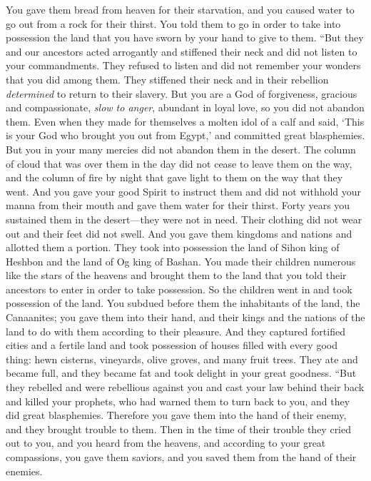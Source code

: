 \begin{biblechapter}
\verse You gave them bread from heaven for their starvation, and you caused water to go out from a rock for their thirst. You told them to go in order to take into possession the land that you have sworn by your hand to give to them.
\verse “But they and our ancestors acted arrogantly and stiffened their neck and did not listen to your commandments.
\verse They refused to listen and did not remember your wonders that you did among them. They stiffened their neck and in their rebellion \textit{determined} to return to their slavery. But you are a God of forgiveness, gracious and compassionate, \textit{slow to anger}, abundant in loyal love, so you did not abandon them.
\verse Even when they made for themselves a molten idol of a calf and said, ‘This is your God who brought you out from Egypt,’ and committed great blasphemies.
\verse But you in your many mercies did not abandon them in the desert. The column of cloud that was over them in the day did not cease to leave them on the way, and the column of fire by night that gave light to them on the way that they went.
\verse And you gave your good Spirit to instruct them and did not withhold your manna from their mouth and gave them water for their thirst.
\verse Forty years you sustained them in the desert—they were not in need. Their clothing did not wear out and their feet did not swell.
\verse And you gave them kingdoms and nations and allotted them a portion. They took into possession the land of Sihon king of Heshbon and the land of Og king of Bashan.
\verse You made their children numerous like the stars of the heavens and brought them to the land that you told their ancestors to enter in order to take possession.
\verse So the children went in and took possession of the land. You subdued before them the inhabitants of the land, the Canaanites; you gave them into their hand, and their kings and the nations of the land to do with them according to their pleasure.
\verse And they captured fortified cities and a fertile land and took possession of houses filled with every good thing: hewn cisterns, vineyards, olive groves, and many fruit trees. They ate and became full, and they became fat and took delight in your great goodness.
\verse “But they rebelled and were rebellious against you and cast your law behind their back and killed your prophets, who had warned them to turn back to you, and they did great blasphemies.
\verse Therefore you gave them into the hand of their enemy, and they brought trouble to them. Then in the time of their trouble they cried out to you, and you heard from the heavens, and according to your great compassions, you gave them saviors, and you saved them from the hand of their enemies.

\end{biblechapter}
